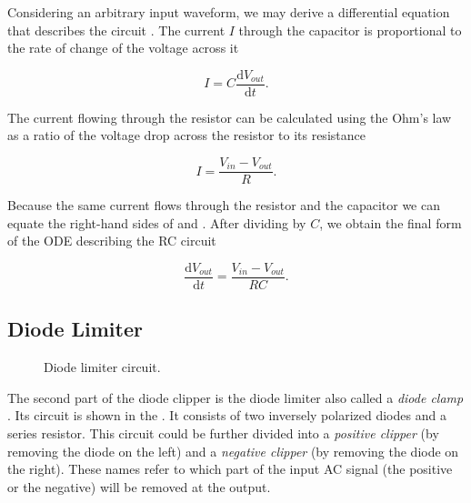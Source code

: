 Considering an arbitrary input waveform, we may derive a differential equation that describes the circuit \cite{Horowitz2015}. The current $I$ through the capacitor is proportional to the rate of change of the voltage across it

\begin{equation}
  I = C \frac{\mathrm{d}V_{out}}{\mathrm{d} t}.
  \label{eq:current_through_capacitor}
\end{equation}

The current flowing through the resistor can be calculated using the Ohm's law as a ratio of the voltage drop across the resistor to its resistance

\begin{equation}
  I = \frac{V_{in} - V_{out}}{R}.
  \label{eq:current_through_resistor}
\end{equation}

Because the same current flows through the resistor and the capacitor we can equate the right-hand sides of  and . After dividing by $C$, we obtain the final form of the \ac{ODE} describing the RC circuit

\begin{equation}
  \frac{\mathrm{d}V_{out}}{\mathrm{d} t} = \frac{V_{in} - V_{out}}{RC}.
\end{equation}



\subsection*{Diode Limiter}
\begin{figure}
  \centering
  
  \caption{Diode limiter circuit.}
  \label{fig:diode_limiter}
\end{figure}

The second part of the diode clipper is the diode limiter also called a \emph{diode clamp} \cite{Malvino2016}. Its circuit is shown in the . It consists of two inversely polarized diodes and a series resistor. This circuit could be further divided into a \emph{positive clipper} (by removing the diode on the left) and a \emph{negative clipper} (by removing the diode on the right). These names refer to which part of the input \ac{AC} signal (the positive or the negative) will be removed at the output.

